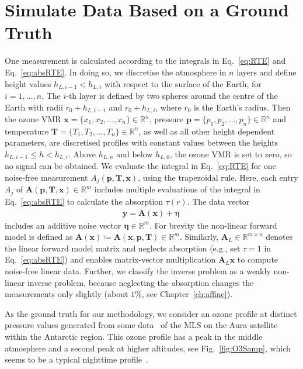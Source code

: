 \section{Simulate Data Based on a Ground Truth}
\label{sec:SimDat}
One measurement is calculated according to the integrals in Eq.~\ref{eq:RTE} and Eq.~\ref{eq:absRTE}.
In doing so, we discretise the atmosphere in $n$ layers and define height values $h_{L,i-1} < h_{L,i}$ with respect to the surface of the Earth, for $i = 1, \dots, n$.
The $i$-th layer is defined by two spheres around the centre of the Earth with radii $ r_0 + h_{L,i-1} $ and $r_0 + h_{L,i}$, where $r_0$ is the Earth's radius.
Then the ozone VMR $\bm{x} =\{x_1,x_2,\ldots,x_n\} \in \mathbb{R}^{n}$, pressure $\bm{p} =\{p_1,p_2,\ldots,p_n\} \in \mathbb{R}^{n}$ and temperature $\bm{T} =\{T_1,T_2,\ldots,T_n\} \in \mathbb{R}^{n}$, as well as all other height dependent parameters, are discretised profiles with constant values between the heights $h_{L,i-1} \leq h < h_{L,i}$.
Above $h_{L, n}$ and below $h_{L,0} $, the ozone VMR is set to zero, so no signal can be obtained.
We evaluate the integral in Eq.~\eqref{eq:RTE} for one noise-free measurement $A_{j}(\bm{p},\bm{T},\bm{x})$, using the trapezoidal rule.
Here, each entry $A_{j}$ of $\bm{A}(\bm{p},\bm{T},\bm{x})\in \mathbb{R}^{m}$ includes multiple evaluations of the integral in Eq.~\ref{eq:absRTE} to calculate the absorption $\tau(r)$.
The data vector
\begin{align}
	\bm{y} = \bm{A}(\bm{x}) + \bm{\eta}\, 
\end{align}
includes an additive noise vector $\bm{\eta} \in \mathbb{R}^{m}$.
For brevity the non-linear forward model is defined as $\bm{A}(\bm{x}) \coloneqq \bm{A}(\bm{x},  \bm{p},\bm{T})   \in \mathbb{R}^{m}$.
Similarly, $\bm{A}_L\in \mathbb{R}^{m\times n}$ denotes the linear forward model matrix and neglects absorption (e.g., set $\tau = 1$ in Eq.~\eqref{eq:absRTE}) and enables matrix-vector multiplication $\bm{A}_L \bm{x}$ to compute noise-free linear data.
Further, we classify the inverse problem as a weakly non-linear inverse problem, because neglecting the absorption changes the measurements only slightly (about $1\%$, see Chapter~\ref{ch:affine}).

As the ground truth for our methodology, we consider an ozone profile at distinct pressure values generated from some data~\cite{MLSdata} of the MLS on the Aura satellite within the Antarctic region.
This ozone profile has a peak in the middle atmosphere and a second peak at higher altitudes, see Fig.~\ref{fig:O3Samp}, which seems to be a typical nighttime profile~\cite{Lee2020NightOzone}.

